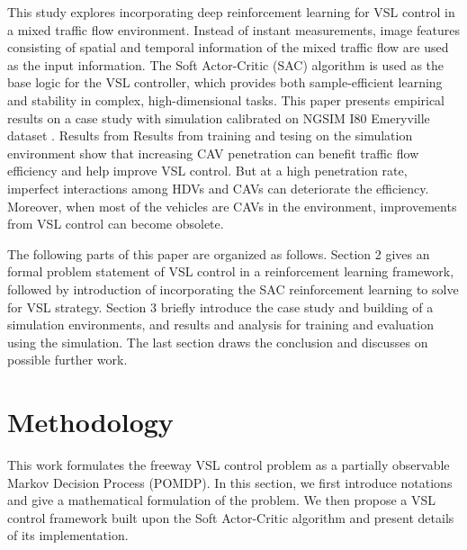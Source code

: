 \documentclass[11pt, letterpaper]{article}
\begin{document}
This study explores incorporating deep reinforcement learning for VSL control in a mixed traffic flow environment. Instead of instant measurements, image features consisting of spatial and temporal information of the mixed traffic flow are used as the input information. The Soft Actor-Critic (SAC) algorithm \citep{pmlr-v80-haarnoja18b} is used as the base logic for the VSL controller, which provides both sample-efficient learning and stability in complex, high-dimensional tasks. This paper presents empirical results on a case study with simulation calibrated on NGSIM I80 Emeryville dataset \citep*{ngsim2020}. Results from Results from training and tesing on the simulation environment show that increasing CAV penetration can benefit traffic flow efficiency and help improve VSL control. But at a high penetration rate, imperfect interactions among HDVs and CAVs can deteriorate the efficiency. Moreover, when most of the vehicles are CAVs in the environment, improvements from VSL control can become obsolete. %

The following parts of this paper are organized as follows. Section 2 gives an formal problem statement of VSL control in a reinforcement learning framework, followed by introduction of incorporating the SAC reinforcement learning to solve for VSL strategy. Section 3 briefly introduce the case study and building of a simulation environments, and results and analysis for training and evaluation using the simulation. The last section draws the conclusion and discusses on possible further work.



\section{Methodology}

This work formulates the freeway VSL control problem as a partially observable Markov Decision Process (POMDP). In this section, we first introduce notations and give a mathematical formulation of the problem. We then propose a VSL control framework built upon the Soft Actor-Critic algorithm and present details of its implementation.
\end{document}
